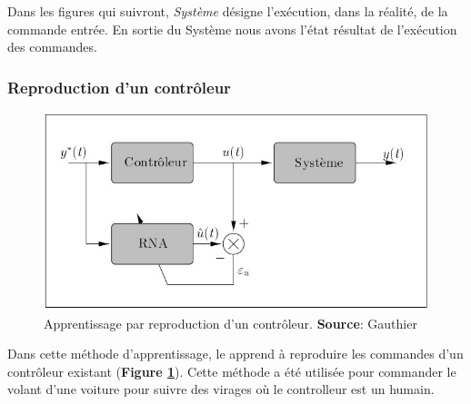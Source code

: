 Dans les figures qui suivront, \emph{Système} désigne l'exécution, dans la réalité, de la commande entrée.
En sortie du Système nous avons l'état résultat de l'exécution des commandes.

\subsubsection{Reproduction d'un contrôleur}
\begin{figure}
 \centering
 \includegraphics[scale=0.5]{../figures/appsimple.jpg}
 \caption{Apprentissage par reproduction d'un contrôleur. \textbf{Source}: Gauthier\cite{Gauthier}}
 \label{appcontroleur}
\end{figure}
Dans cette méthode d'apprentissage, le \rna apprend à reproduire les commandes d'un contrôleur existant (\textbf{Figure \ref{appcontroleur}}).
Cette méthode a été utilisée pour commander le volant d'une voiture pour suivre des virages où le controlleur est un humain\cite{Pomerleau}.

